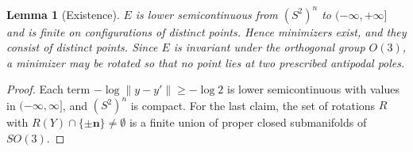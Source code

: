 \documentclass[11pt]{article}
\newtheorem{lemma}[theorem]{Lemma}
\theoremstyle{definition}
\theoremstyle{remark}
\begin{document}
\begin{lemma}[Existence]\label{lem:existence}
$E$ is lower semicontinuous from $(S^2)^n$ to $(-\infty,+\infty]$ and is finite on configurations
of distinct points. Hence minimizers exist, and they consist of distinct points. Since $E$ is
invariant under the orthogonal group $O(3)$, a minimizer may be rotated so that no point lies at
two prescribed antipodal poles.
\end{lemma}
\begin{proof}
Each term $-\log\|y-y'\|\ge-\log2$ is lower semicontinuous with values in $(-\infty,\infty]$, and
$(S^2)^n$ is compact. For the last claim, the set of rotations $R$ with $R(Y)\cap\{\pm\mathbf n\}\ne\emptyset$
is a finite union of proper closed submanifolds of $SO(3)$.
\end{proof}
\end{document}
